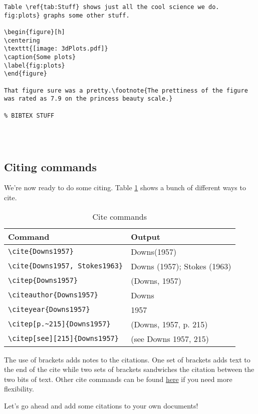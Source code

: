 \begin{lstlisting}
Table \ref{tab:Stuff} shows just all the cool science we do. fig:plots} graphs some other stuff.

\begin{figure}[h]
\centering
\texttt{[image: 3dPlots.pdf]}
\caption{Some plots}
\label{fig:plots}
\end{figure}

That figure sure was a pretty.\footnote{The prettiness of the figure was rated as 7.9 on the princess beauty scale.}

% BIBTEX STUFF




\end{lstlisting}


\subsection*{Citing commands}

We're now ready to do some citing. Table \ref{tab:Citations} shows a bunch of different ways to cite.

\begin{table}[h]
	\centering
	\caption{Cite commands}
	\label{tab:Citations}
\begin{small}
  \begin{center}
    \begin{tabular}{ll}
	Command & Output \\ \hline
	\verb|\cite{Downs1957}| & Downs(1957) \\
	\verb|\cite{Downs1957, Stokes1963}| & Downs (1957); Stokes (1963) \\
	\verb|\citep{Downs1957}| & (Downs, 1957) \\
	\verb|\citeauthor{Downs1957}| & Downs \\
	\verb|\citeyear{Downs1957}| & 1957 \\
	\verb|\citep[p.~215]{Downs1957}|	 & (Downs, 1957, p. 215) \\ 
	\verb|\citep[see][215]{Downs1957}| & (see Downs 1957, 215) \\ \hline
	
    \end{tabular}
  \end{center}
\end{small}
\end{table}

The use of brackets adds notes to the citations. One set of brackets adds text to the end of the cite while two sets of brackets sandwiches the citation between the two bits of text. Other cite commands can be found \href{http://merkel.zoneo.net/Latex/natbib.php}{here} if you need more flexibility.

Let's go ahead and add some citations to your own documents!
